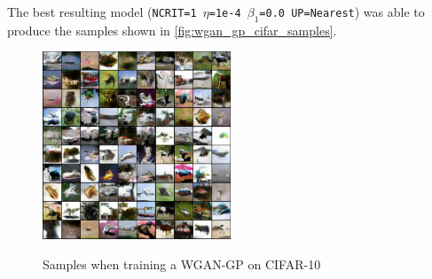 The best resulting model (\texttt{NCRIT=1 $\eta$=1e-4 $\beta_1$=0.0 UP=Nearest}) was able to produce the samples shown in \autoref{fig:wgan_gp_cifar_samples}.
\begin{figure}
    \centering
    \caption{Samples when training a WGAN-GP on CIFAR-10}
    \includegraphics[width=0.5\textwidth]{chapters/Experiments/WGAN-GP/cifar_samples.png}
    \label{fig:wgan_gp_cifar_samples}
\end{figure}
